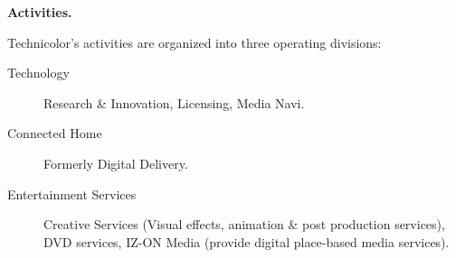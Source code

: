 {\large\bf Activities.}

Technicolor's activities are organized into three operating divisions:
\begin{description}
  \item[Technology] Research \& Innovation, Licensing, Media Navi.
  \item[Connected Home] Formerly Digital Delivery.
  \item[Entertainment Services] Creative Services (Visual effects, animation \& post production services), DVD services, IZ-ON Media (provide digital place-based media services).  \\
\end{description}

\doublespacing